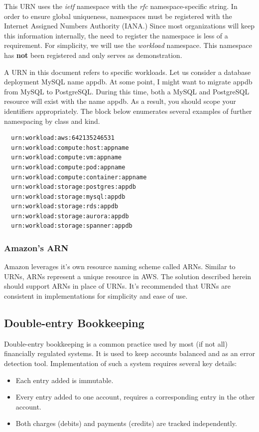 \documentclass[10pt, a4paper, twocolumn]{article}
\begin{document}
    This URN uses the \textit{ietf} namespace with the \textit{rfc} namespace-specific string.
    In order to ensure global uniqueness, namespaces must be registered with the Internet Assigned Numbers Authority (IANA.)
    Since most organizations will keep this information internally, the need to register the namespace is less of a requirement.
    For simplicity, we will use the \textit{workload} namespace.
    This namespace has \textbf{not} been registered and only serves as demonstration.

    A URN in this document refers to specific workloads.
    Let us consider a database deployment MySQL name appdb.
    At some point, I might want to migrate appdb from MySQL to PostgreSQL.
    During this time, both a MySQL and PostgreSQL resource will exist with the name appdb.
    As a result, you should scope your identifiers appropriately.
    The block below enumerates several examples of further namespacing by class and kind.

\begin{verbatim}
  urn:workload:aws:642135246531
  urn:workload:compute:host:appname
  urn:workload:compute:vm:appname
  urn:workload:compute:pod:appname
  urn:workload:compute:container:appname
  urn:workload:storage:postgres:appdb
  urn:workload:storage:mysql:appdb
  urn:workload:storage:rds:appdb
  urn:workload:storage:aurora:appdb
  urn:workload:storage:spanner:appdb
\end{verbatim}

    \subsubsection*{Amazon's ARN}
      Amazon leverages it's own resource naming scheme called ARNs.
      Similar to URNs, ARNs represent a unique resource in AWS.
      The solution described herein should support ARNs in place of URNs.
      It's recommended that URNs are consistent in implementations for simplicity and ease of use.

  \subsection*{Double-entry Bookkeeping}
    Double-entry bookkeeping is a common practice used by most (if not all) financially regulated systems.
    It is used to keep accounts balanced and as an error detection tool.
    Implementation of such a system requires several key details:

    \begin{itemize}
      \item Each entry added is immutable.
      \item Every entry added to one account, requires a corresponding entry in the other account.
      \item Both charges (debits) and payments (credits) are tracked independently.
    \end{itemize}
\end{document}

